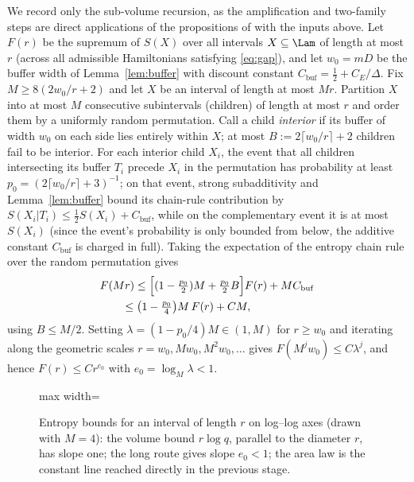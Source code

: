 \precisely
We record only the sub-volume recursion, as the amplification and
two-family steps are direct applications of the propositions of \cite{AL}
with the inputs above. Let $F(r)$ be the supremum of $S(X)$ over all
intervals $X\subseteq\Lam$ of length at most $r$ (across all admissible
Hamiltonians satisfying \eqref{eq:gap}), and let $w_0=mD$ be the buffer
width of Lemma~\ref{lem:buffer} with discount constant
$C_{\mathrm{buf}}=\frac12+C_E/\Delta$. Fix $M\ge 8(2w_0/r+2)$ and let $X$
be an interval of length at most $Mr$. Partition $X$ into at most $M$
consecutive subintervals (children) of length at most $r$ and order them by
a uniformly random permutation. Call a child \emph{interior} if its buffer
of width $w_0$ on each side lies entirely within $X$; at most
$B:=2\lceil w_0/r\rceil+2$ children fail to be interior. For each interior
child $X_i$, the event that all children intersecting its buffer $T_i$
precede $X_i$ in the permutation has probability at least
$p_0=(2\lceil w_0/r\rceil+3)^{-1}$; on that event, strong subadditivity and
Lemma~\ref{lem:buffer} bound its chain-rule contribution by
$S(X_i|T_i)\le\frac12S(X_i)+C_{\mathrm{buf}}$, while on the complementary
event it is at most $S(X_i)$ (since the event's probability is only bounded
from below, the additive constant $C_{\mathrm{buf}}$ is charged in full).
Taking the expectation of the entropy chain rule over the random
permutation gives
\[
\begin{split}
 &F(Mr)\le\Bigl[(1-\tfrac{p_0}2)M+\tfrac{p_0}2B\Bigr]F(r)+MC_{\mathrm{buf}}\\
 &\qquad\le\bigl(1-\tfrac{p_0}4\bigr)M\,F(r)+C M ,
\end{split}
\]
using $B\le M/2$. Setting $\lambda=(1-p_0/4)M\in(1,M)$ for $r\ge w_0$ and
iterating along the geometric scales $r=w_0,Mw_0,M^2w_0,\dots$ gives
$F(M^jw_0)\le C\lambda^j$, and hence $F(r)\le Cr^{e_0}$ with
$e_0=\log_M\lambda<1$.

\begin{figure}[t]
\centering
\begin{adjustbox}{max width=\linewidth}

\end{adjustbox}
\caption{Entropy bounds for an interval of length $r$ on log–log axes (drawn with $M=4$): the volume bound $r\log q$, parallel to the diameter $r$, has slope one; the long route gives slope $e_0<1$; the area law is the constant line reached directly in the previous stage.}\label{fig:recursion}
\end{figure}

